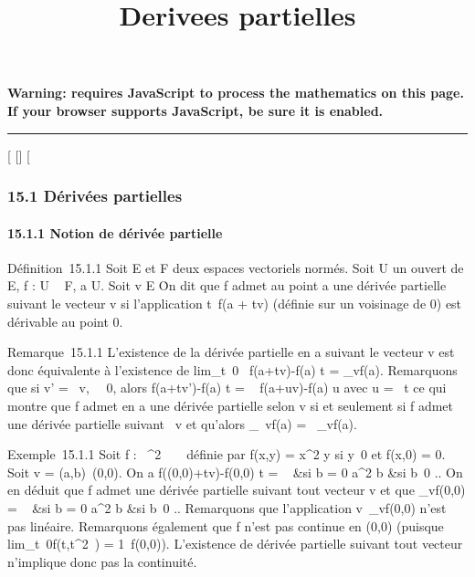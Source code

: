 \documentclass[]{article}
\title{Derivees partielles}
\author{}
\date{}
\begin{document}
\maketitle

\textbf{Warning: 
requires JavaScript to process the mathematics on this page.\\ If your
browser supports JavaScript, be sure it is enabled.}

\begin{center}\rule{3in}{0.4pt}\end{center}

[
[]
[

\subsubsection{15.1 Dérivées partielles}

\paragraph{15.1.1 Notion de dérivée partielle}

Définition~15.1.1 Soit E et F deux espaces vectoriels normés. Soit U un
ouvert de E, f : U \rightarrow~ F, a \in U. Soit v \in E
\diagdown\0\. On dit que f admet au point a
une dérivée partielle suivant le vecteur v si l'application
t\mapsto~f(a + tv) (définie sur un voisinage de 0)
est dérivable au point 0.

Remarque~15.1.1 L'existence de la dérivée partielle en a suivant le
vecteur v est donc équivalente à l'existence de
lim_t\rightarrow~0~ f(a+tv)-f(a)
\over t = \partial_vf(a). Remarquons que si v' = \lambda~v,
\lambda~\neq~0, alors  f(a+tv')-f(a)
\over t = \lambda~ f(a+uv)-f(a) \over u
avec u = \lambda~t ce qui montre que f admet en a une dérivée partielle selon v
si et seulement si f admet une dérivée partielle suivant \lambda~v et qu'alors
\partial_\lambda~vf(a) = \lambda~\partial_vf(a).

Exemple~15.1.1 Soit f : ~^2 \rightarrow~ ~ définie par f(x,y) =
x^2 \over y si
y\neq~0 et f(x,0) = 0. Soit v =
(a,b)\neq~(0,0). On a  f((0,0)+tv)-f(0,0)
\over t = \left \
 &si b = 0 \cr 
a^2 \over b &si
b\neq~0  \right .. On en déduit
que f admet une dérivée partielle suivant tout vecteur v et que
\partial_vf(0,0) = \left \
 &si b = 0 \cr 
a^2 \over b &si
b\neq~0  \right .. Remarquons
que l'application v\mapsto~\partial_vf(0,0) n'est
pas linéaire. Remarquons également que f n'est pas continue en (0,0)
(puisque lim_t\rightarrow~0f(t,t^2~) =
1\neq~f(0,0)). L'existence de dérivée partielle
suivant tout vecteur n'implique donc pas la continuité.
\end{document}
